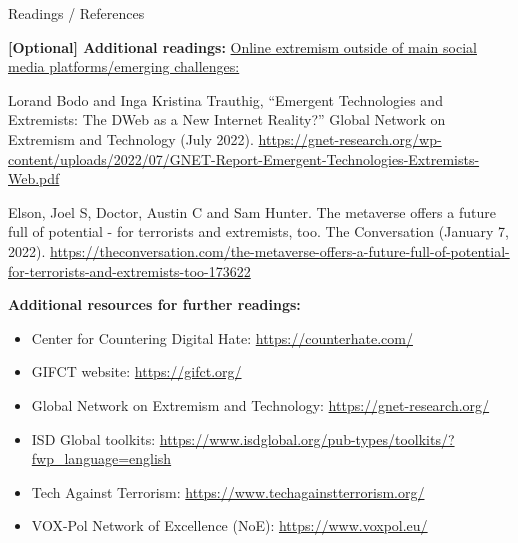 \documentclass[nobackground,dvipsnames,table]{beamer}
\begin{document}
\begin{frame}{Readings / References}
\tiny{

\textbf{[Optional] Additional readings:} 
\underline{Online extremism outside of main social media platforms/emerging challenges:}
\begin{itemize}
    \tiny{
    \item Lorand Bodo and Inga Kristina Trauthig, “Emergent Technologies and Extremists: The DWeb as a New Internet Reality?” Global Network on Extremism and Technology (July 2022). \url{https://gnet-research.org/wp-content/uploads/2022/07/GNET-Report-Emergent-Technologies-Extremists-Web.pdf}
    \item Elson, Joel S, Doctor, Austin C and Sam Hunter. The metaverse offers a future full of potential - for terrorists and extremists, too. The Conversation (January 7, 2022). \url{https://theconversation.com/the-metaverse-offers-a-future-full-of-potential-for-terrorists-and-extremists-too-173622}
    }
\end{itemize}

\textbf{Additional resources for further readings:}
\begin{itemize}
    \item Center for Countering Digital Hate: \url{https://counterhate.com/}
    \item GIFCT website: \url{https://gifct.org/}
    \item Global Network on Extremism and Technology: \url{https://gnet-research.org/}
    \item ISD Global toolkits: \url{https://www.isdglobal.org/pub-types/toolkits/?fwp_language=english}
    \item Tech Against Terrorism: \url{https://www.techagainstterrorism.org/}
    \item VOX-Pol Network of Excellence (NoE): \url{https://www.voxpol.eu/}
\end{itemize}

}
\end{frame}

\end{document}
